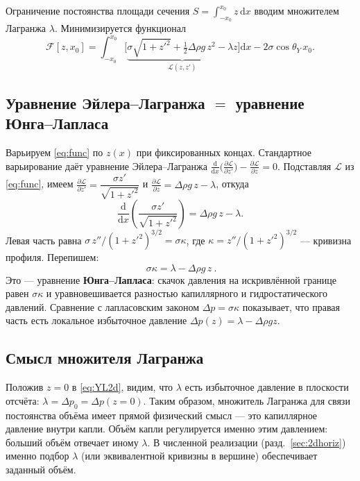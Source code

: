 \documentclass[11pt]{article}
\newcommand{\rd}{\mathrm{d}}
\newcommand{\thY}{\theta_{Y}}
\newcommand{\dd}[2]{\frac{\rd #1}{\rd #2}}
\newcommand{\pd}[2]{\frac{\partial #1}{\partial #2}}
\theoremstyle{definition}
\begin{document}
Ограничение постоянства площади сечения $S=\int_{-x_0}^{x_0} z\,\rd x$ вводим
множителем Лагранжа $\lambda$. Минимизируется функционал
\begin{equation}
\mathcal{F}[z,x_0]=\int_{-x_0}^{x_0}\!\Big[\underbrace{\sigma\sqrt{1+z'^{2}}
+\tfrac12\Delta\rho g\,z^{2}-\lambda z}_{\displaystyle \mathcal{L}(z,z')}\Big]\rd x
-2\sigma\cos\thY\,x_0 .
\label{eq:func}
\end{equation}

\subsection{Уравнение Эйлера--Лагранжа $=$ уравнение Юнга--Лапласа}
Варьируем \eqref{eq:func} по $z(x)$ при фиксированных концах. Стандартное
варьирование даёт уравнение Эйлера--Лагранжа
$\dd{}{x}\!\big(\pd{\mathcal L}{z'}\big)-\pd{\mathcal L}{z}=0$. Подставляя
$\mathcal{L}$ из \eqref{eq:func}, имеем
$\pd{\mathcal L}{z'}=\dfrac{\sigma z'}{\sqrt{1+z'^{2}}}$ и
$\pd{\mathcal L}{z}=\Delta\rho g\,z-\lambda$, откуда
\begin{equation}
\dd{}{x}\!\left(\frac{\sigma z'}{\sqrt{1+z'^{2}}}\right)
=\Delta\rho g\,z-\lambda .
\label{eq:ELraw}
\end{equation}
Левая часть равна $\sigma\,z''/(1+z'^{2})^{3/2}=\sigma\kappa$, где
$\kappa=z''/(1+z'^{2})^{3/2}$ --- кривизна профиля. Перепишем:
\begin{equation}
\boxed{\ \sigma\kappa=\lambda-\Delta\rho g\,z\ }.
\label{eq:YL2d}
\end{equation}
Это --- уравнение \textbf{Юнга--Лапласа}: скачок давления на искривлённой границе
равен $\sigma\kappa$ и уравновешивается разностью капиллярного и гидростатического
давлений. Сравнение с лапласовским законом $\Delta p=\sigma\kappa$ показывает, что
правая часть есть локальное избыточное давление $\Delta p(z)=\lambda-\Delta\rho g z$.

\subsection{Смысл множителя Лагранжа}
Положив $z=0$ в \eqref{eq:YL2d}, видим, что $\lambda$ есть избыточное давление в
плоскости отсчёта: $\lambda=\Delta p_{0}=\Delta p(z=0)$. Таким образом, множитель
Лагранжа для связи постоянства объёма имеет прямой физический смысл --- это
капиллярное давление внутри капли. Объём капли регулируется именно этим давлением:
больший объём отвечает иному $\lambda$. В численной реализации (разд.~\ref{sec:2dhoriz})
именно подбор $\lambda$ (или эквивалентной кривизны в вершине) обеспечивает
заданный объём.
\end{document}
